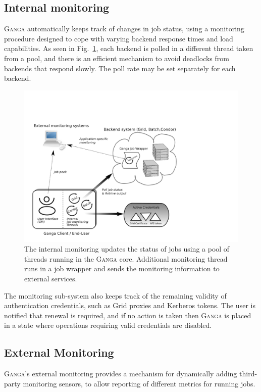 \documentclass{elsart}
\def\ganga {\textsc{Ganga}\xspace}
\def\grid {Grid\xspace}
\begin{document}
\begin{linenumbers}
\subsection{Internal monitoring}
\label{sec:GangaMonitoring}
\ganga automatically keeps track of changes in job status, using a
monitoring procedure designed to cope with
varying backend response times and load capabilities. As seen in
Fig.~\ref{fig:job_status_monitoring_mechanism}, each backend is polled in a
different thread taken from a pool, and there is an efficient mechanism
to avoid deadlocks from backends that respond slowly. The poll rate may be
set separately for each backend.
\begin{figure}[htbp]
  \begin{center}
    \includegraphics[width=1 \textwidth]{monitoring}
    \caption{The internal monitoring updates the status of jobs using a pool of threads running in the \ganga core. Additional monitoring thread runs in a job wrapper and sends the monitoring information to external services. }
    \label{fig:job_status_monitoring_mechanism}
  \end{center}
\end{figure}

The monitoring sub-system also keeps track of the remaining validity of
authentication credentials, such as \grid proxies and Kerberos tokens.
The user is notified that renewal is required, and if no action is
taken then \ganga is placed in a state where operations requiring
valid credentials are disabled.

\subsection{External Monitoring}
\label{sec:ExternalMonitoring}
\ganga's external monitoring provides a mechanism for dynamically adding third-party
monitoring sensors, to allow reporting of different metrics for running jobs.


\end{linenumbers}
\end{document}
